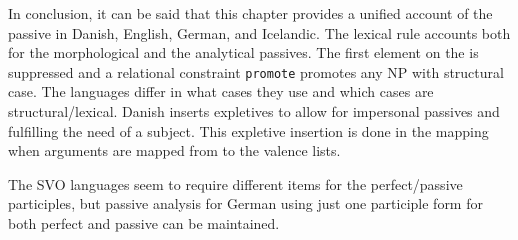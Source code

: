 In conclusion, it can be said that this chapter provides a unified account of the passive in Danish,
English, German, and Icelandic. The lexical rule accounts both for the morphological and the
analytical passives. The first element on the \argstl is suppressed and a relational constraint
\texttt{promote} promotes any NP with structural case. The languages differ in what cases they use and
which cases are structural/lexical. Danish inserts expletives to allow for impersonal passives and
fulfilling the need of a subject. This expletive insertion is done in the \argst mapping when
arguments are mapped from \argst to the valence lists.

The SVO languages seem to require different items for the perfect/passive participles, but 
passive analysis for German using just one participle form for both perfect and passive can be maintained.




